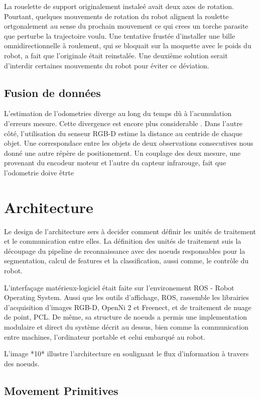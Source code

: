 La rouelette de support originalement instaleé avait deux axes de
rotation. Pourtant, quelques mouvements de rotation du robot alignent
la roulette ortgonalement au sense du prochain mouvement ce qui crees
un torche parasite que perturbe la trajectoire voulu. Une tentative
frustée d'installer une bille omnidirectionnelle à roulement, qui se
bloquait sur la moquette avec le poids du robot, a fait que
l'originale était reinstalée. Une deuxième solution serait d'interdir
certaines mouvements du robot pour éviter ce déviation.

\subsection{Fusion de données}

L'estimation de l'odometries diverge au long du temps dû à
l'acumulation d'erreurs mesure. Cette divergence est encore plus
considerable . Dans l'autre côté, l'utilisation du senseur RGB-D
estime la distance au centride de chaque objet. Une correspondace
entre les objets de deux observations consecutives nous donné une
autre répère de positionement. Un couplage des deux mesure, une
provenant du encodeur moteur et l'autre du capteur infrarouge, fait
que l'odometrie doive êtrte

\section{Architecture}

Le design de l'architecture sers à decider comment définir les unités de traitement et le communication entre elles. La définition des unités de traitement suis la découpage du pipeline de reconnaissance avec des noeuds responsables pour la segmentation, calcul de features et la classification, aussi comme, le contrôle du robot.

L'interfaçage matérieux-logiciel était faite sur l'environement ROS -
Robot Operating System. Aussi que les outils d'affichage, ROS, 
rassemble les librairies d'acquisition d'images RGB-D, OpenNi 2 et Freenect, et de traitement de nuage de point, PCL.
De même, sa structure de noeuds a permis une implementation modulaire et direct du
système décrit au dessus, bien comme la communication entre machines, l'ordinateur portable et celui embarqué au robot.

L'image *10* illustre l'architecture en soulignant le flux d'information à travers des noeuds.

\subsection{Movement Primitives}

